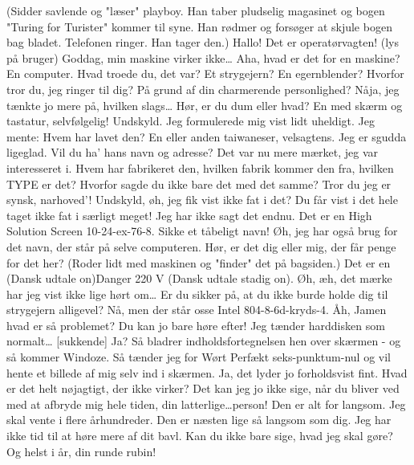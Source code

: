 \documentclass[10pt]{article}
\begin{document}
\begin{sketch}
(Sidder savlende og "læser" playboy. Han taber pludselig magasinet
og bogen "Turing for Turister" kommer til syne. Han rødmer og forsøger at skjule 
bogen bag bladet. Telefonen ringer. Han tager den.)
Hallo! Det er operatørvagten!
(lys på bruger)
Goddag, min maskine virker ikke\ldots
{}Aha, hvad er det for en maskine?
En computer. Hvad troede du, det var? Et strygejern? En egernblender?
Hvorfor tror du, jeg ringer til dig? På grund af din charmerende personlighed?
Nåja, jeg tænkte jo mere på, hvilken slags\ldots
{}Hør, er du dum eller hvad? En med skærm og tastatur, selvfølgelig!
Undskyld. Jeg formulerede mig vist lidt uheldigt. Jeg mente: Hvem
har lavet den?
En eller anden taiwaneser, velsagtens. Jeg er sgudda ligeglad. Vil du 
ha' hans navn og adresse?
Det var nu mere mærket, jeg var interesseret i. Hvem har fabrikeret
den, hvilken fabrik kommer den fra, hvilken TYPE er det?
Hvorfor sagde du ikke bare det med det samme? Tror du jeg er synsk, 
narhoved'!
Undskyld, øh, jeg fik vist ikke fat i det?
Du får vist i det hele taget ikke fat i særligt meget! Jeg har ikke
sagt det endnu. Det er en High Solution Screen 10-24-ex-76-8. Sikke et tåbeligt
navn!
Øh, jeg har også brug for det navn, der står på selve computeren.
Hør, er det dig eller mig, der får penge for det her? (Roder lidt med 
maskinen og "finder" det på bagsiden.) Det er en (Dansk udtale on)Danger 220 V
(Dansk udtale stadig on).
Øh, æh, det mærke har jeg vist ikke lige hørt om\ldots
{}Er du sikker på, at du ikke burde holde dig til strygejern alligevel?
Nå, men der står osse Intel 804-8-6d-kryds-4.
Åh, Jamen hvad er så problemet?
Du kan jo bare høre efter! Jeg tænder harddisken som normalt\ldots
{}[sukkende] Ja?
Så bladrer indholdsfortegnelsen hen over skærmen - og så kommer 
Windoze. Så tænder jeg for Wørt Perfækt seks-punktum-nul og vil hente et billede
af mig selv ind i skærmen.
Ja, det lyder jo forholdsvist fint. Hvad er det helt nøjagtigt, der
ikke virker?
Det kan jeg jo ikke sige, når du bliver ved med at afbryde mig hele 
tiden, din latterlige\ldots person! Den er alt for langsom. Jeg skal vente i flere 
århundreder. Den er næsten lige så langsom som dig. Jeg har ikke tid til at høre 
mere af dit bavl. Kan du ikke bare sige, hvad jeg skal gøre? Og helst i år, din 
runde rubin!

\end{sketch}
\end{document}
